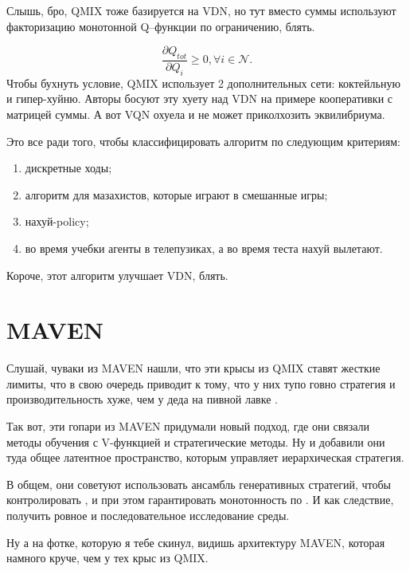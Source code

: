 Слышь, бро, QMIX тоже базируется на VDN, но тут вместо суммы используют факторизацию монотонной Q--функции по ограничению, блять.

\begin{equation}
	\frac{\partial Q_{tot}}{\partial Q_i} \geq 0,\forall i \in \mathcal{N}.
\end{equation}
Чтобы бухнуть условие, QMIX использует 2 дополнительных сети: коктейльную и гипер-хуйню. Авторы босуют эту хуету над VDN на примере кооперативки с матрицей суммы. А вот VQN охуела и не может приколхозить эквилибриума.

Это все ради того, чтобы классифицировать алгоритм по следующим критериям:
\begin{enumerate}[label={\arabic*)}]
	\item дискретные ходы;
	\item алгоритм для мазахистов, которые играют в смешанные игры;
	\item нахуй-policy;
	\item во время учебки агенты в телепузиках, а во время теста нахуй вылетают.
\end{enumerate}

Короче, этот алгоритм улучшает VDN, блять.

\section{MAVEN}

Слушай, чуваки из MAVEN нашли, что эти крысы из QMIX ставят жесткие лимиты, что в свою очередь приводит к тому, что у них тупо говно стратегия и производительность хуже, чем у деда на пивной лавке \cite{DBLP:journals/corr/abs-1910-07483}.

Так вот, эти гопари из MAVEN придумали новый подход, где они связали методы обучения с V-функцией и стратегические методы. Ну и добавили они туда общее латентное пространство, которым управляет иерархическая стратегия.

В общем, они советуют использовать ансамбль генеративных стратегий, чтобы контролировать , и при этом гарантировать монотонность по . И как следствие, получить ровное и последовательное исследование среды.

Ну а на фотке, которую я тебе скинул, видишь архитектуру MAVEN, которая намного круче, чем у тех крыс из QMIX.

